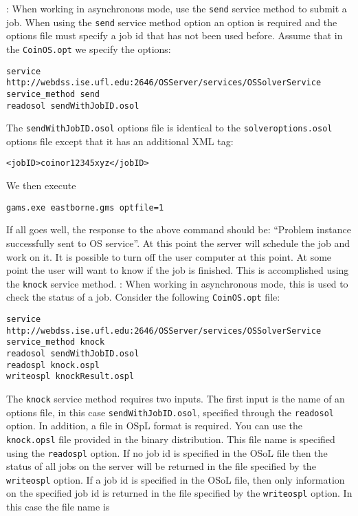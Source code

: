 \vskip 8pt
: When working in asynchronous mode, use the {\tt send} service method 
to submit a job. When using  the {\tt send} service method option an option is required and the options file
must specify a  job id that has not been used before.  Assume that in the  {\tt CoinOS.opt}  we specify 
the options:
\vskip 8pt
\begin{verbatim}
service http://webdss.ise.ufl.edu:2646/OSServer/services/OSSolverService
service_method send
readosol sendWithJobID.osol
\end{verbatim}
The {\tt sendWithJobID.osol} options file is identical to the {\tt solveroptions.osol} options file except 
that it has an additional XML tag:
\begin{verbatim}
<jobID>coinor12345xyz</jobID> 
\end{verbatim}
We then execute
\vskip 8pt
\begin{verbatim}
gams.exe eastborne.gms optfile=1
\end{verbatim}
If all goes well, the response to the above command should  be: ``Problem instance successfully sent to 
OS service''. At this point the server will schedule the job and work on it. It is possible to turn off 
the user computer at this point. At some point the user will want to know if the job is finished. 
This is accomplished using the {\tt knock} service method.
\vskip 8pt
: When working in asynchronous mode, this is used to check the status 
of a job.  Consider the following {\tt CoinOS.opt} file:
\vskip 8pt
\begin{verbatim}
service http://webdss.ise.ufl.edu:2646/OSServer/services/OSSolverService
service_method knock
readosol sendWithJobID.osol 
readospl knock.ospl
writeospl knockResult.ospl
\end{verbatim}
The {\tt knock} service method requires two  inputs. The first input is the name of an options file, 
in this case {\tt sendWithJobID.osol}, specified through the {\tt readosol} option. In addition, a file 
in OSpL format is required. You can use the {\tt knock.opsl} file provided in the binary distribution. 
This file name is specified using the {\tt readospl} option. If no job id is specified in the OSoL file 
then the status of all jobs on the server will be returned in the file specified by the {\tt writeospl} 
option. If a job id is specified in the OSoL file, then only information on the specified job id is 
returned in the file specified by the {\tt writeospl} option.  In this case the file name is 
